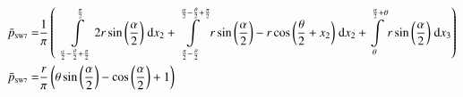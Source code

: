 \begin{align}
    \bar{p}_{\text{\tiny{SW7}}} =&\frac{1}{\pi} \left(\;\;\int\limits_{\frac{\alpha}{2} - \frac{\theta}{2} + \frac{\pi}{2}}^{\frac{\pi}{2}}2 r \sin{\left (\frac{\alpha}{2} \right )}\;\mathrm{d}x_{2}+\int\limits_{\frac{\pi}{2} - \frac{\theta}{2}}^{\frac{\alpha}{2} - \frac{\theta}{2} + \frac{\pi}{2}}r \sin{\left (\frac{\alpha}{2} \right )} - r \cos{\left (\frac{\theta}{2} + x_{2} \right )}\;\mathrm{d}x_{2}+\int\limits_{\theta}^{\frac{\alpha}{2} + \theta}r \sin{\left (\frac{\alpha}{2} \right )}\;\mathrm{d}x_{3}\right)\label{pSW7Def}\\
    \bar{p}_{\text{\tiny{SW7}}}  =& \frac{r}{\pi} \left(\theta \sin{\left (\frac{\alpha}{2} \right )} - \cos{\left (\frac{\alpha}{2} \right )} + 1\right)\label{pSW7Sln}
\end{align}
